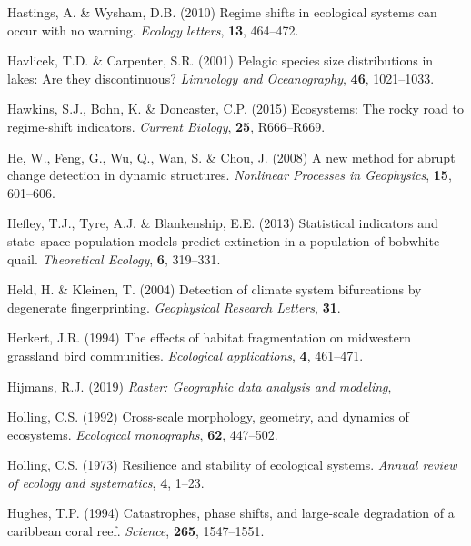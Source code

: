 \documentclass[print]{nuthesis}
\begin{document}
\leavevmode\hypertarget{ref-hastings2010regime}{}%
Hastings, A. \& Wysham, D.B. (2010) Regime shifts in ecological systems can occur with no warning. \emph{Ecology letters}, \textbf{13}, 464--472.

\leavevmode\hypertarget{ref-havlicek2001pelagic}{}%
Havlicek, T.D. \& Carpenter, S.R. (2001) Pelagic species size distributions in lakes: Are they discontinuous? \emph{Limnology and Oceanography}, \textbf{46}, 1021--1033.

\leavevmode\hypertarget{ref-hawkins2015ecosystems}{}%
Hawkins, S.J., Bohn, K. \& Doncaster, C.P. (2015) Ecosystems: The rocky road to regime-shift indicators. \emph{Current Biology}, \textbf{25}, R666--R669.

\leavevmode\hypertarget{ref-he2008new}{}%
He, W., Feng, G., Wu, Q., Wan, S. \& Chou, J. (2008) A new method for abrupt change detection in dynamic structures. \emph{Nonlinear Processes in Geophysics}, \textbf{15}, 601--606.

\leavevmode\hypertarget{ref-hefley2013statistical}{}%
Hefley, T.J., Tyre, A.J. \& Blankenship, E.E. (2013) Statistical indicators and state--space population models predict extinction in a population of bobwhite quail. \emph{Theoretical Ecology}, \textbf{6}, 319--331.

\leavevmode\hypertarget{ref-held2004detection}{}%
Held, H. \& Kleinen, T. (2004) Detection of climate system bifurcations by degenerate fingerprinting. \emph{Geophysical Research Letters}, \textbf{31}.

\leavevmode\hypertarget{ref-herkert1994effects}{}%
Herkert, J.R. (1994) The effects of habitat fragmentation on midwestern grassland bird communities. \emph{Ecological applications}, \textbf{4}, 461--471.

\leavevmode\hypertarget{ref-raster}{}%
Hijmans, R.J. (2019) \emph{Raster: Geographic data analysis and modeling},

\leavevmode\hypertarget{ref-holling1992cross}{}%
Holling, C.S. (1992) Cross-scale morphology, geometry, and dynamics of ecosystems. \emph{Ecological monographs}, \textbf{62}, 447--502.

\leavevmode\hypertarget{ref-holling1973resilience}{}%
Holling, C.S. (1973) Resilience and stability of ecological systems. \emph{Annual review of ecology and systematics}, \textbf{4}, 1--23.

\leavevmode\hypertarget{ref-hughes_catastrophes_1994}{}%
Hughes, T.P. (1994) Catastrophes, phase shifts, and large-scale degradation of a caribbean coral reef. \emph{Science}, \textbf{265}, 1547--1551.
\end{document}
